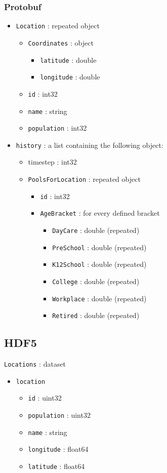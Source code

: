 \subsubsection{Protobuf}
\begin{itemize}
\item \texttt{Location} : repeated object
\begin{itemize}
\item \texttt{Coordinates} : object
\begin{itemize}
\item \texttt{latitude} : double
\item \texttt{longitude} : double
\end{itemize}
\item \texttt{id} : int32
\item \texttt{name} : string
\item \texttt{population} : int32
\end{itemize}
\end{itemize}
\begin{itemize}

\item \texttt{history} : a list containing the following object:
\begin{itemize}
\item{timestep} : int32
\item \texttt{PoolsForLocation} : repeated object
\begin{itemize}
\item \texttt{id} : int32
\item \texttt{AgeBracket} : for every defined bracket
\begin{itemize}
\item \texttt{DayCare}	 : double (repeated)
\item \texttt{PreSchool} : double (repeated)
\item \texttt{K12School} : double (repeated)
\item \texttt{College}	 : double (repeated)
\item \texttt{Workplace} : double (repeated)
\item \texttt{Retired}	 : double (repeated)
\end{itemize}
\end{itemize}
\end{itemize}
\end{itemize}

\subsection{HDF5}
\texttt{Locations} : dataset
\begin{itemize}
\item \texttt{location}
\begin{itemize}
\item \texttt{id} : uint32
\item \texttt{population} : uint32
\item \texttt{name} : string
\item \texttt{longitude} : float64
\item \texttt{latitude} : float64
\end{itemize}
\end{itemize}

